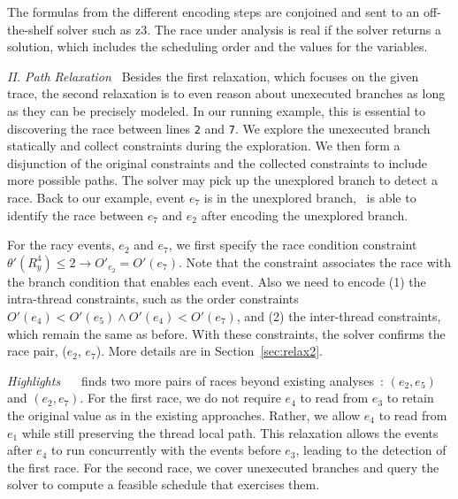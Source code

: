 The formulas from the different encoding steps are conjoined and sent to an 
off-the-shelf solver such as {\sf z3}.  The race under analysis is real 
if the solver returns a solution, which includes the scheduling order 
and the values for the variables. 


\smallskip
\noindent
{\em II. Path Relaxation\ } 
Besides the first relaxation, which focuses on the given trace, the second
relaxation is to even reason about unexecuted branches as long as they
can be precisely modeled. In our 
running example, this is essential to discovering the race between 
lines {\tt 2} and {\tt 7}. We explore the unexecuted branch statically 
and collect constraints during the exploration. We then form a disjunction  
of the original constraints and the collected constraints to include more 
possible  paths. The solver may pick up the unexplored branch to detect 
a race. Back to our example, event $e_7$ is in the unexplored branch, \tool\ 
is able to identify the race between $e_7$ and $e_2$ after encoding 
the unexplored branch. 

For the racy events, $e_2$ and $e_7$, we first specify the race condition 
constraint  $\theta'(R^4_y)\leq 2\rightarrow O'_{e_2}=O'(e_7)$. Note that 
the constraint associates the race with the branch condition that 
enables each event.  Also we need to encode (1) the intra-thread constraints, 
such as the  order constraints $O'(e_4)<O'(e_5)\wedge O'(e_4)<O'(e_7)$, 
and (2) the inter-thread constraints, which remain the same as before. 
With these constraints, the solver confirms the race pair, ($e_2$, $e_7$). 
More details are in Section~\ref{sec:relax2}.



\smallskip
\noindent
{\em Highlights \ } \tool\  finds two more pairs of races 
beyond existing analyses~\cite{yannis, pldi14}: $(e_2, e_5)$ and $(e_2, e_7)$.
For the first race, we do not require $e_4$ to read from $e_3$ to 
retain the original value as in the
existing approaches. Rather, we allow $e_4$ to read from $e_1$ while 
still preserving the thread local path. This relaxation allows 
the events after $e_4$ to run concurrently with the events before 
$e_3$, leading to the detection of the first race.  For the second race, 
we cover unexecuted branches and query the solver to compute a feasible 
schedule that exercises them. 

 
